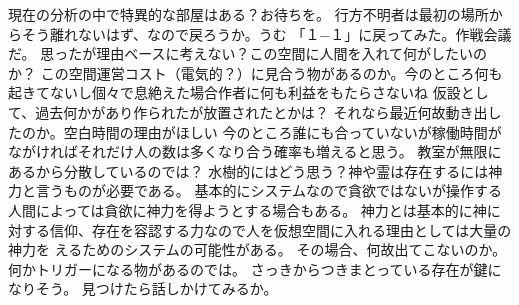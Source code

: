 \documentclass[uplatex]{utbook}
\begin{document}
現在の分析の中で特異的な部屋はある？お待ちを。
行方不明者は最初の場所からそう離れないはず、なので戻ろうか。うむ
「１−１」に戻ってみた。作戦会議だ。
思ったが理由ベースに考えない？この空間に人間を入れて何がしたいのか？
この空間運営コスト（電気的？）に見合う物があるのか。今のところ何も起きてないし個々で息絶えた場合作者に何も利益をもたらさないね
仮設として、過去何かがあり作られたが放置されたとかは？
それなら最近何故動き出したのか。空白時間の理由がほしい
今のところ誰にも合っていないが稼働時間がながければそれだけ人の数は多くなり合う確率も増えると思う。
教室が無限にあるから分散しているのでは？
水樹的にはどう思う？神や霊は存在するには神力と言うものが必要である。
基本的にシステムなので貪欲ではないが操作する人間によっては貪欲に神力を得ようとする場合もある。
神力とは基本的に神に対する信仰、存在を容認する力なので人を仮想空間に入れる理由としては大量の神力を
えるためのシステムの可能性がある。
その場合、何故出てこないのか。何かトリガーになる物があるのでは。
さっきからつきまとっている存在が鍵になりそう。
見つけたら話しかけてみるか。
\end{document}
